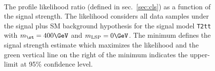 \begin{figure}[t!]
  \begin{center}
     \\
    \caption{\label{fig:t2cc-best-fit}The profile likelihood ratio 
      (defined in sec.~\ref{sec:cls}) as a function of the signal strength.
      The likelihood considers all data samples under the signal plus SM 
      background hypothesis for the signal model \texttt{T2tt} with 
      $m_{\st} = 400\GeV$ and $m_{\text{LSP}} = 0\GeV$.
      The minimum defines the signal strength estimate which maximizes the
      likelihood and the green vertical line on the right of the minimum 
      indicates the upper-limit at 95\% confidence level.}
  \end{center}
\end{figure}

